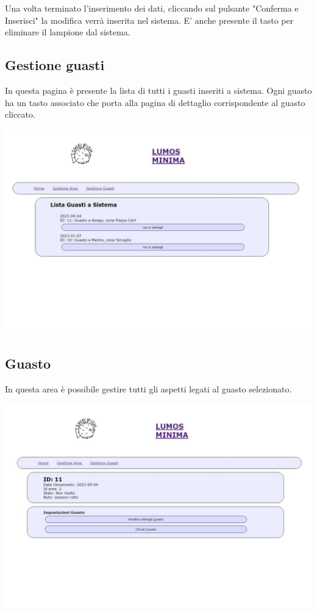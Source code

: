 \documentclass[9pt]{article}
\begin{document}
Una volta terminato l'inserimento dei dati, cliccando sul pulsante "Conferma e Inserisci"
la modifica verrà inserita nel sistema.
E' anche presente il tasto per eliminare il lampione dal sistema.


\subsection{Gestione guasti}
In questa pagina è presente la lista di tutti i guasti inseriti a sistema.
Ogni guasto ha un tasto associato che porta alla pagina di dettaglio corrispondente al guasto cliccato.

\begin{center}
	\includegraphics[scale=0.3]{Gestione_guasti.png}
\end{center}

\subsection{Guasto}

In questa area è possibile gestire tutti gli aspetti legati al guasto selezionato.

\begin{center}
	\includegraphics[scale=0.3]{Guasto.png}
\end{center}
\end{document}

